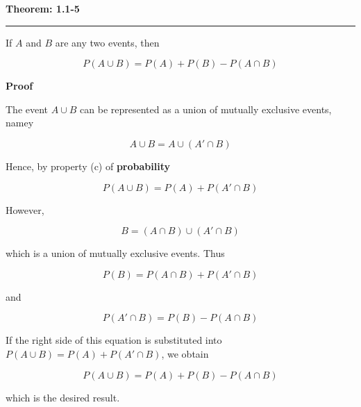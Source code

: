 \nopagenumbers
{\bf Theorem: 1.1-5}
\vskip 1mm
\hrule

\vskip 6pt
If $A$ and $B$ are any two events, then

$$P(A\cup B)=P(A)+P(B)-P(A\cap B)$$

\vskip 10pt
{\bf Proof}

\vskip 6pt
The event $A\cup B$ can be represented as a union of mutually exclusive events, namey

$$A\cup B= A\cup (A' \cap B)$$

Hence, by property (c) of {\bf probability}

$$P(A\cup B)=P(A)+P(A'\cap B)$$

However,

$$B=(A\cap B)\cup (A'\cap B)$$

which is a union of mutually exclusive events. Thus

$$P(B)=P(A\cap B)+P(A'\cap B)$$

and

$$P(A'\cap B)=P(B)-P(A\cap B)$$

If the right side of this equation is substituted into $P(A\cup B)=P(A)+P(A'\cap B)$, we obtain

$$P(A\cup B)=P(A)+P(B)-P(A\cap B)$$

which is the desired result.


\vfill\eject
\bye
